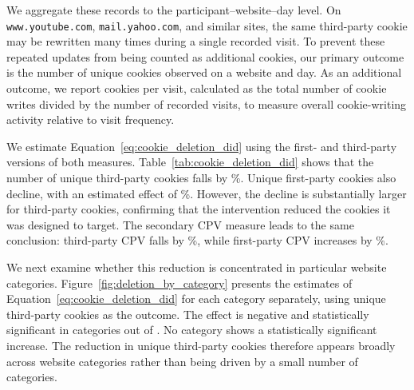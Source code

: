 \documentclass[12pt]{article}
\theoremstyle{definition}
\theoremstyle{remark}
\begin{document}
\begin{appendix}
We aggregate these records to the participant--website--day level. On
\texttt{www.youtube.com}, \texttt{mail.yahoo.com}, and similar sites, the same
third-party cookie may be rewritten many times during a single recorded visit.
To prevent these repeated updates from being counted as additional cookies, our
primary outcome is the number of unique cookies observed on a website and day.
As an additional outcome, we report cookies per visit, calculated as the total
number of cookie writes divided by the number of recorded visits, to measure
overall cookie-writing activity relative to visit frequency.

\begin{table}[H]
\centering
\caption{Effect of Cookie Deletion on Third-Party Cookies}
\label{tab:cookie_deletion_did}
\resizebox{\textwidth}{!}{

}
\caption*{\scriptsize \textsc{Notes}: This table reports PPML difference-in-differences estimates of the effect of cookie deletion on first- and third-party cookies. Columns~(1) and~(2) use the numbers of unique first- and third-party cookies, respectively. Columns~(3) and~(4) use first- and third-party CPV, respectively. The treatment group begins cookie deletion one week before the control group. The analysis window spans seven days before and after the treatment group's deletion start time. Equation~\eqref{eq:cookie_deletion_did} is estimated for all four dependent variables with participant, website, and calendar-date fixed effects. Participant--website--day observations with 30 seconds or less of browsing time are excluded. Observation counts differ because some participants or websites have no positive values for a particular outcome and are excluded from that column. Standard errors are clustered at the participant level.}
\end{table}

We estimate Equation~\eqref{eq:cookie_deletion_did} using the first- and third-party versions of both measures. Table~\ref{tab:cookie_deletion_did} shows that the number of unique third-party cookies falls by \ucMainPct\%. Unique first-party cookies also decline, with an estimated effect of \cookieFirstPartyUcPct\%. However, the decline is substantially larger for third-party cookies, confirming that the intervention reduced the cookies it was designed to target. The secondary CPV measure leads to the same conclusion: third-party CPV falls by \cookieCpvPct\%, while first-party CPV increases by \cookieFirstPartyCpvPct\%.

We next examine whether this reduction is concentrated in particular website categories. Figure~\ref{fig:deletion_by_category} presents the estimates of Equation~\eqref{eq:cookie_deletion_did} for each category separately, using unique third-party cookies as the outcome. The effect is negative and statistically significant in \nSigNegUcCategories{} categories out of \nUcCategories{}. No category shows a statistically significant increase. The reduction in unique third-party cookies therefore appears broadly across website categories rather than being driven by a small number of categories.


\end{appendix}
\end{document}
